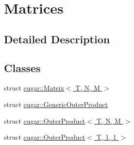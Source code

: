 \hypertarget{group___matrices_module}{}\section{Matrices}
\label{group___matrices_module}


\subsection{Detailed Description}
\subsection*{Classes}
\begin{DoxyCompactItemize}
\item 
struct \hyperlink{structcugar_1_1_matrix}{cugar\+::\+Matrix$<$ T, N, M $>$}
\item 
struct \hyperlink{structcugar_1_1_generic_outer_product}{cugar\+::\+Generic\+Outer\+Product}
\item 
struct \hyperlink{structcugar_1_1_outer_product}{cugar\+::\+Outer\+Product$<$ T, N, M $>$}
\item 
struct \hyperlink{structcugar_1_1_outer_product_3_01_t_00_011_00_011_01_4}{cugar\+::\+Outer\+Product$<$ T, 1, 1 $>$}
\end{DoxyCompactItemize}
